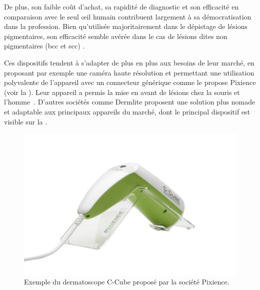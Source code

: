 De plus, son faible coût d’achat, sa rapidité de diagnostic et son efficacité en comparaison avec le seul œil humain \cite{Lallas2013} contribuent largement à sa démocratisation dans la profession. Bien qu’utilisée majoritairement dans le dépistage de lésions pigmentaires, son efficacité semble avérée dans le cas de lésions dites non pigmentaires (\gls{bcc} et \gls{scc}) \cite{Lallas2013}. 

Ces dispositifs tendent à s'adapter de plus en plus aux besoins de leur marché, en proposant par exemple une caméra haute résolution et permettant une utilisation polyvalente de l'appareil avec un connecteur générique comme le propose Pixience (voir la ). Leur appareil a permis la mise en avant de lésions chez la souris et l'homme~\cite{Cinotti2016,Pillon2017}. D'autres sociétés comme Dermlite proposent une solution plus nomade et adaptable aux principaux appareils du marché, dont le principal dispositif est visible sur la .\par

\begin{figure}[H]
    \centering
    \includegraphics[width=0.50\linewidth]{contents/chapter_2/resources/example_device_ccube.jpg}
    \caption{Exemple du dermatoscope C-Cube proposé par la société Pixience.}
    \label{fig:example_device_ccube}
\end{figure}\par


